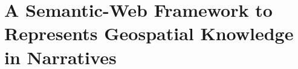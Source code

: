






\chapter{A Semantic-Web Framework to Represents Geospatial Knowledge in Narratives}\label{chap:SW-framework}

